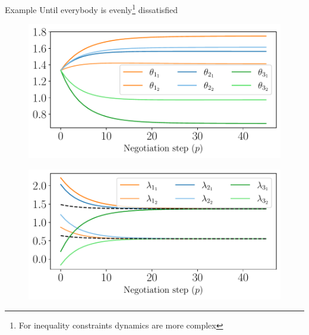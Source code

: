 \documentclass[aspectratio=169]{beamer}
\begin{document}
\begin{frame}{Example}
  \centering
  Until everybody is evenly\footnote{For inequality constraints dynamics are more complex} dissatisfied
  \vspace{1cm}

  \begin{minipage}{0.45\textwidth}
    \begin{figure}
      \includegraphics[width=\textwidth]{../img/example_primal_decomposition/example_theta.pdf}
    \end{figure}
  \end{minipage}
  \hfill
  \begin{minipage}{0.45\textwidth}
    \begin{figure}
      \centering
      \includegraphics[width=\textwidth]{../img/example_primal_decomposition/example_lambda.pdf}
    \end{figure}
  \end{minipage}
\end{frame}
\end{document}

